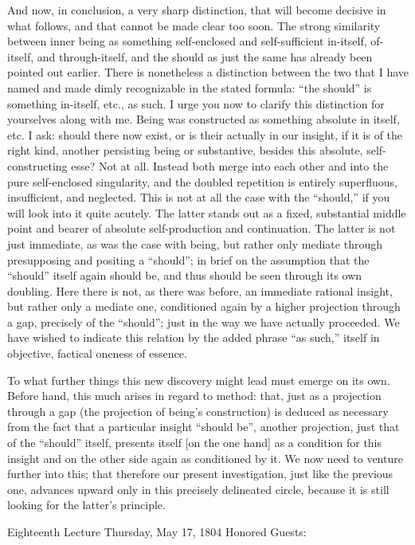 And now, in conclusion, a very sharp distinction,
that will become decisive in what follows,
and that cannot be made clear too soon.
The strong similarity between inner being
as something self-enclosed and self-sufficient
in-itself, of-itself, and through-itself,
and the should as just the same
has already been pointed out earlier.
There is nonetheless a distinction
between the two that I have named
and made dimly recognizable in the stated formula:
“the should” is something in-itself, etc., as such.
I urge you now to clarify this distinction
for yourselves along with me.
Being was constructed as something absolute in itself, etc.
I ask: should there now exist,
or is their actually in our insight,
if it is of the right kind,
another persisting being or substantive,
besides this absolute, self-constructing esse?
Not at all.
Instead both merge into each other
and into the pure self-enclosed singularity,
and the doubled repetition is entirely
superfluous, insufficient, and neglected.
This is not at all the case with the “should,”
if you will look into it quite acutely.
The latter stands out as a fixed, substantial
middle point and bearer of
absolute self-production and continuation.
The latter is not just immediate,
as was the case with being,
but rather only mediate through
presupposing and positing a “should”;
in brief on the assumption that
the “should” itself again should be,
and thus should be seen through its own doubling.
Here there is not, as there was before,
an immediate rational insight,
but rather only a mediate one,
conditioned again by a higher
projection through a gap,
precisely of the “should”;
just in the way we have actually proceeded.
We have wished to indicate this relation
by the added phrase “as such,”
itself in objective, factical oneness of essence.

To what further things this new discovery
might lead must emerge on its own.
Before hand, this much arises in regard to method:
that, just as a projection through a gap
(the projection of being's construction)
is deduced as necessary from the fact
that a particular insight “should be”,
another projection, just that of the “should” itself,
presents itself [on the one hand] as
a condition for this insight
and on the other side again as conditioned by it.
We now need to venture further into this;
that therefore our present investigation,
just like the previous one,
advances upward only in this
precisely delineated circle,
because it is still looking
for the latter's principle.

Eighteenth Lecture
Thursday, May 17, 1804
Honored Guests:

